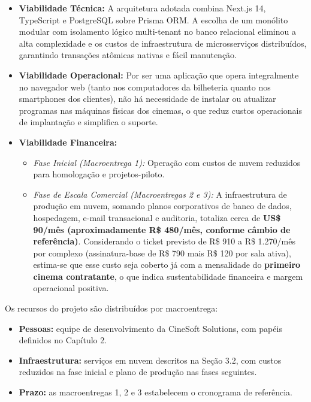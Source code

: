 \begin{itemize}
\item \textbf{Viabilidade Técnica:} A arquitetura adotada combina Next.js 14, TypeScript e PostgreSQL sobre Prisma ORM. A escolha de um monólito modular com isolamento lógico multi-tenant no banco relacional eliminou a alta complexidade e os custos de infraestrutura de microsserviços distribuídos, garantindo transações atômicas nativas e fácil manutenção.
\item \textbf{Viabilidade Operacional:} Por ser uma aplicação que opera integralmente no navegador web (tanto nos computadores da bilheteria quanto nos smartphones dos clientes), não há necessidade de instalar ou atualizar programas nas máquinas físicas dos cinemas, o que reduz custos operacionais de implantação e simplifica o suporte.
\item \textbf{Viabilidade Financeira:}
\begin{itemize}
\item \emph{Fase Inicial (Macroentrega 1):} Operação com custos de nuvem reduzidos para homologação e projetos-piloto.
\item \emph{Fase de Escala Comercial (Macroentregas 2 e 3):} A infraestrutura de produção em nuvem, somando planos corporativos de banco de dados, hospedagem, e-mail transacional e auditoria, totaliza cerca de \textbf{US\$ 90/mês (aproximadamente R\$ 480/mês, conforme câmbio de referência)}. Considerando o ticket previsto de R\$ 910 a R\$ 1.270/mês por complexo (assinatura-base de R\$ 790 mais R\$ 120 por sala ativa), estima-se que esse custo seja coberto já com a mensalidade do \textbf{primeiro cinema contratante}, o que indica sustentabilidade financeira e margem operacional positiva.
\end{itemize}
\end{itemize}


Os recursos do projeto são distribuídos por macroentrega:

\begin{itemize}
\item \textbf{Pessoas:} equipe de desenvolvimento da CineSoft Solutions, com papéis definidos no Capítulo 2.
\item \textbf{Infraestrutura:} serviços em nuvem descritos na Seção 3.2, com custos reduzidos na fase inicial e plano de produção nas fases seguintes.
\item \textbf{Prazo:} as macroentregas 1, 2 e 3 estabelecem o cronograma de referência.
\end{itemize}

